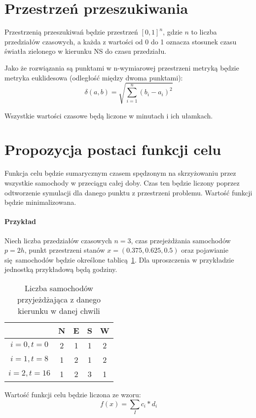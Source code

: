 \documentclass[a4paper]{article}
\begin{document}
\section{Przestrzeń przeszukiwania}
Przestrzenią przeszukiwań będzie przestrzeń $[0, 1]^n$, gdzie $n$ to liczba
przedziałów czasowych, a każda z wartości od 0 do 1 oznacza stosunek czasu światła
zielonego w kierunku NS do czasu przedziału.

Jako że rozwiązania są punktami w n-wymiarowej przestrzeni metryką będzie
metryka euklidesowa (odległość między dwoma punktami):
$$\delta(a, b) = \sqrt{\sum\limits_{i=1}^{n}(b_i - a_i)^2}$$


Wszystkie wartości czasowe będą liczone w minutach i ich ułamkach.

\section{Propozycja postaci funkcji celu}
Funkcja celu będzie sumarycznym czasem spędzonym na skrzyżowaniu przez wszystkie
samochody w przeciągu całej doby. Czas ten będzie liczony poprzez odtworzenie
symulacji dla danego punktu z przestrzeni problemu. Wartość funkcji będzie
minimalizowana.

\paragraph{Przykład} Niech liczba przedziałów czasowych $n=3$, czas
przejeżdżania samochodów $p=2h$, punkt przestrzeni stanów $x=(0.375, 0.625, 0.5)$
oraz pojawianie się samochodów będzie określone tablicą~\ref{tab:example}.
Dla uproszczenia w przykładzie jednostką przykładową będą godziny.

\begin{table}[ht]
    \centering
    \begin{tabular}{| c | c | c | c | c |}
        \hline
         & N & E & S & W \\ \hline
         $i=0, t=0$ & 2 & 1 & 1 & 2\\ \hline
         $i=1, t=8$ & 1 & 2 & 1 & 2\\ \hline
         $i=2, t=16$ & 1 & 2 & 3 & 1\\ \hline
    \end{tabular}
    \caption{Liczba samochodów przyjeżdżająca z danego kierunku w danej chwili\label{tab:example}}
\end{table}

Wartość funkcji celu będzie liczona ze wzoru:
$$f(x) = \sum\limits_{I} c_i * d_i $$
\end{document}
